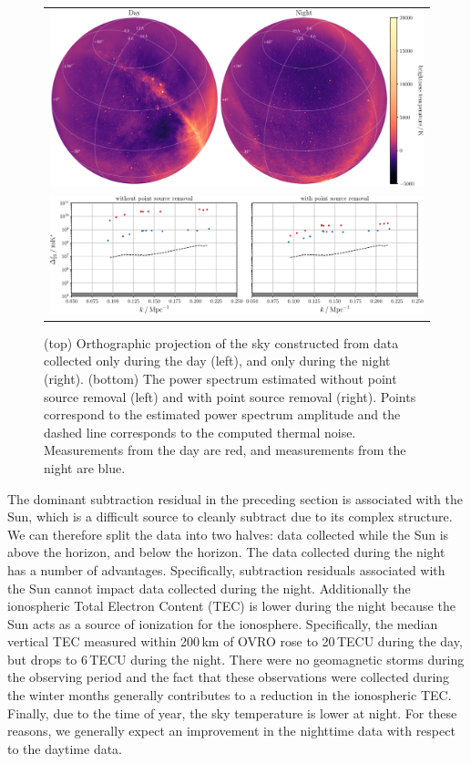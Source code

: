 \documentclass[twocolumn]{aastex62}
\begin{document}
\begin{figure}[t]
    \centering
    \begin{tabular}{c}
        \includegraphics[width=\textwidth]{day-night}\\
        \includegraphics[width=\textwidth]{spherical-power-spectrum-day-night}\\
    \end{tabular}
    \caption{
        (top) Orthographic projection of the sky constructed from data collected only during the day
        (left), and only during the night (right).
        (bottom) The power spectrum estimated without point source removal (left) and with point
        source removal (right). Points correspond to the estimated power spectrum amplitude and the
        dashed line corresponds to the computed thermal noise. Measurements from the day are red,
        and measurements from the night are blue.
    }
    \label{fig:spherical-power-spectra-day-night}
\end{figure}

The dominant subtraction residual in the preceding section is associated with the Sun, which is a
difficult source to cleanly subtract due to its complex structure. We can therefore split the data
into two halves: data collected while the Sun is above the horizon, and below the horizon. The data
collected during the night has a number of advantages. Specifically, subtraction residuals
associated with the Sun cannot impact data collected during the night.  Additionally the ionospheric
Total Electron Content (TEC) is lower during the night because the Sun acts as a source of
ionization for the ionosphere. Specifically, the median vertical TEC measured within 200\,km of OVRO
rose to 20\,TECU during the day, but drops to 6\,TECU during the night. There were no geomagnetic
storms during the observing period and the fact that these observations were collected during the
winter months generally contributes to a reduction in the ionospheric TEC.  Finally, due to the time
of year, the sky temperature is lower at night. For these reasons, we generally expect an
improvement in the nighttime data with respect to the daytime data.
\end{document}
